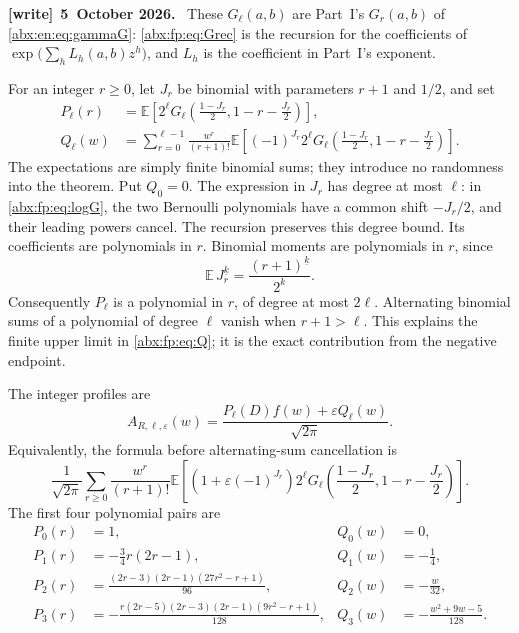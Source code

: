 \documentclass[11pt,letterpaper]{article}
\numberwithin{equation}{section}
\theoremstyle{remark}\newtheorem{remark}[theorem]{Remark}
\newcommand{\eps}{\varepsilon}
\newcommand{\E}{\mathbb E}
\newcommand{\sq}{\sqrt{2\pi}}
\newcommand{\fall}[2]{#1^{\underline{#2}}}
\newenvironment{writenote}[1][]{\par\smallskip\begingroup\small
 \noindent\textbf{[write]}\if\relax\detokenize{#1}\relax\else~\textbf{#1.}\fi\ }%
 {\par\endgroup\smallskip}
\begin{document}
\begin{writenote}[5~October 2026]
These $G_\ell(a,b)$ are Part~I's $G_r(a,b)$ of \eqref{abx:en:eq:gammaG}: \eqref{abx:fp:eq:Grec} is the recursion for the coefficients of $\exp\bigl(\sum_hL_h(a,b)z^h\bigr)$, and $L_h$ is the coefficient in Part~I's exponent.
\end{writenote}

For an integer $r\ge0$, let $J_r$ be binomial with parameters
$r+1$ and $1/2$, and set
\begin{align}
 P_\ell(r)&=\E\!\left[2^\ell G_\ell\!\left(
                 \frac{1-J_r}{2},1-r-\frac{J_r}{2}\right)\right],
                 \label{abx:fp:eq:P}\\
 Q_\ell(w)&=\sum_{r=0}^{\ell-1}\frac{w^r}{(r+1)!}
    \E\!\left[(-1)^{J_r}2^\ell G_\ell\!\left(
                 \frac{1-J_r}{2},1-r-\frac{J_r}{2}\right)\right].
                 \label{abx:fp:eq:Q}
\end{align}
The expectations are simply finite binomial sums; they introduce no
randomness into the theorem. Put $Q_0=0$. The expression in $J_r$
has degree at most $\ell$: in \eqref{abx:fp:eq:logG}, the two Bernoulli
polynomials have a common shift $-J_r/2$, and their leading powers
cancel. The recursion preserves this degree bound. Its coefficients
are polynomials in $r$. Binomial moments are polynomials in $r$, since
\[
 \E\,\fall{J_r}{k}=\frac{\fall{(r+1)}{k}}{2^k}.
\]
Consequently $P_\ell$ is a polynomial in $r$, of degree at most
$2\ell$. Alternating binomial sums of a polynomial of degree $\ell$
vanish when $r+1>\ell$. This explains the finite upper limit in
\eqref{abx:fp:eq:Q}; it is the exact contribution from the negative endpoint.

The integer profiles are
\begin{equation}\label{abx:fp:eq:Aalgorithm}
 A_{R,\ell,\eps}(w)=\frac{P_\ell(D)f(w)+\eps Q_\ell(w)}{\sq}.
\end{equation}
Equivalently, the formula before alternating-sum cancellation is
\begin{equation}\label{abx:fp:eq:Aseries}
 \frac1{\sq}\sum_{r\ge0}\frac{w^r}{(r+1)!}
 \E\!\left[(1+\eps(-1)^{J_r})2^\ell
 G_\ell\!\left(\frac{1-J_r}{2},1-r-\frac{J_r}{2}\right)\right].
\end{equation}
The first four polynomial pairs are
\begin{align*}
 P_0(r)&=1, & Q_0(w)&=0,\\
 P_1(r)&=-\frac34r(2r-1), & Q_1(w)&=-\frac14,\\
 P_2(r)&=\frac{(2r-3)(2r-1)(27r^2-r+1)}{96},
 & Q_2(w)&=-\frac w{32},\\
 P_3(r)&=-\frac{r(2r-5)(2r-3)(2r-1)(9r^2-r+1)}{128},
 & Q_3(w)&=-\frac{w^2+9w-5}{128}.
\end{align*}
\end{document}
